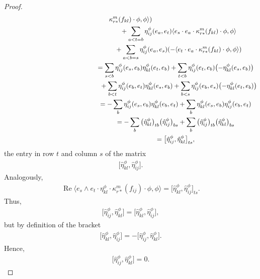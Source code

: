\documentclass[10pt,a4paper]{amsart}
\numberwithin{equation}{section}
\begin{document}
\begin{proof}
\begin{gather*}
\kappa_{r*}^m(f_{kl})\cdot\phi,\phi\rangle )\\
\hphantom{\operatorname{Re}\big\langle e_s\wedge e_t \cdot \eta_{ij}^\phi\cdot \kappa_{r*}^m(f_{kl})\cdot\phi,\phi\big\rangle=}{}
 +\sum_{a<t=b}\eta_{ij}^\phi(e_a,e_t)\langle e_s\cdot e_a\cdot
\kappa_{r*}^m(f_{kl})\cdot\phi,\phi\rangle \\
\hphantom{\operatorname{Re}\big\langle e_s\wedge e_t \cdot \eta_{ij}^\phi\cdot \kappa_{r*}^m(f_{kl})\cdot\phi,\phi\big\rangle=}{}
 +\sum_{a<b=s}\eta_{ij}^\phi(e_a,e_s)(-\langle e_t \cdot e_a\cdot
\kappa_{r*}^m(f_{kl})\cdot\phi,\phi\rangle )\\
\hphantom{\operatorname{Re}\big\langle e_s\wedge e_t \cdot \eta_{ij}^\phi\cdot \kappa_{r*}^m(f_{kl})\cdot\phi,\phi\big\rangle}{}
= \sum_{s<b}\eta_{ij}^\phi(e_s,e_b)\eta_{kl}^\phi(e_t,e_b) +\sum_{t<b}\eta_{ij}^\phi(e_t,e_b)\big({-}\eta_{kl}^\phi(e_s,e_b)\big)\\
\hphantom{\operatorname{Re}\big\langle e_s\wedge e_t \cdot \eta_{ij}^\phi\cdot \kappa_{r*}^m(f_{kl})\cdot\phi,\phi\big\rangle=}{} +\sum_{b<t}\eta_{ij}^\phi(e_b,e_t)\eta_{kl}^\phi(e_s,e_b) +\sum_{b<s}\eta_{ij}^\phi(e_b,e_s)\big({-}\eta_{kl}^\phi(e_t,e_b)\big)\\
 \hphantom{\operatorname{Re}\big\langle e_s\wedge e_t \cdot \eta_{ij}^\phi\cdot \kappa_{r*}^m(f_{kl})\cdot\phi,\phi\big\rangle }{}
 = -\sum_{b}\eta_{ij}^\phi(e_s,e_b)\eta_{kl}^\phi(e_b,e_t)
+\sum_{b}\eta_{kl}^\phi(e_s,e_b)\eta_{ij}^\phi(e_b,e_t)\\
\hphantom{\operatorname{Re}\big\langle e_s\wedge e_t \cdot \eta_{ij}^\phi\cdot \kappa_{r*}^m(f_{kl})\cdot\phi,\phi\big\rangle}{}
= -\sum_{b}\big(\hat\eta_{kl}^\phi\big)_{tb}\big(\hat\eta_{ij}^\phi\big)_{bs}
+\sum_{b}\big(\hat\eta_{ij}^\phi\big)_{tb}\big(\hat\eta_{kl}^\phi\big)_{bs}\\
\hphantom{\operatorname{Re}\big\langle e_s\wedge e_t \cdot \eta_{ij}^\phi\cdot \kappa_{r*}^m(f_{kl})\cdot\phi,\phi\big\rangle}{}
= \big[\hat\eta_{ij}^\phi,\hat\eta_{kl}^\phi\big]_{ts},
\end{gather*}
the entry in row $t$ and column $s$ of the matrix
\begin{gather*}\big[\hat\eta_{kl}^\phi,\hat\eta_{ij}^\phi\big].\end{gather*}
Analogously,
\begin{gather*}
\operatorname{Re}\big\langle e_s\wedge e_t \cdot \eta_{kl}^\phi\cdot \kappa_{r*}^m(f_{ij})\cdot\phi,\phi\big\rangle
 = \big[\hat\eta_{kl}^\phi,\hat\eta_{ij}^\phi\big]_{ts}.
\end{gather*}
Thus,
\begin{gather*}\big[\hat\eta_{ij}^\phi,\hat\eta_{kl}^\phi\big]=\big[\hat\eta_{kl}^\phi,\hat\eta_{ij}^\phi\big],\end{gather*}
but by definition of the bracket
\begin{gather*}\big[\hat\eta_{kl}^\phi,\hat\eta_{ij}^\phi\big]=-\big[\hat\eta_{ij}^\phi,\hat\eta_{kl}^\phi\big].\end{gather*}
Hence,
\begin{gather*}\big[\hat\eta_{ij}^\phi,\hat\eta_{kl}^\phi\big]=0.\end{gather*}


\end{proof}
\end{document}
